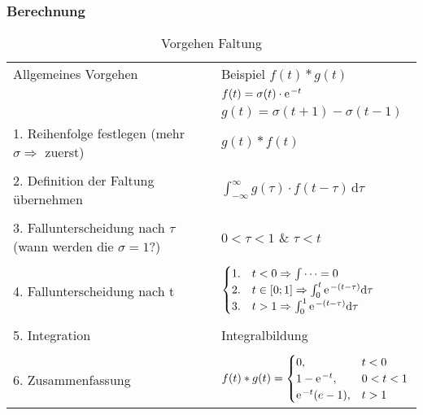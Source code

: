 \subsubsection{Berechnung}
\begin{table}[h]
	\begin{tabular}{ll}
		Allgemeines Vorgehen & Beispiel $f(t) * g(t) $\\
				     &$f(t)=\sigma(t)\cdot\e^{-t}$\\
		       & $g(t) = \sigma(t+1) - \sigma(t-1)$\\
		\toprule
		1. Reihenfolge festlegen (mehr $\sigma \Rightarrow$ zuerst) & $g(t)*f(t)$\\
									    &\\
		2. Definition der Faltung übernehmen & $\int_{-\infty}^{\infty}\!g(\tau)\cdot f(t-\tau)\,\mathrm{d}\tau$\\
						      &\\
		3. Fallunterscheidung nach $\tau$ (wann werden die $\sigma=1$?) & $0 < \tau < 1$ \&  $\tau < t$\\
										&\\
		4. Fallunterscheidung nach t & $\begin{cases} 	1. & t < 0 \Rightarrow \int\dots = 0\\ 
								2. & t \in \left[0;1\right] \Rightarrow \int_0^t\e^{-(t-\tau)}\mathrm{d}\tau\\
								3. & t > 1 \Rightarrow \int_0^1\e^{-(t-\tau)}\mathrm{d}\tau
						\end{cases}$\\
						&\\
		5. Integration & Integralbildung\\
							   &\\
		6. Zusammenfassung & $f(t) * g(t) = \begin{cases}
							0, & t < 0\\
						1-\e^{-t}, & 0 < t < 1\\
						\e^{-t}(e-1), & t > 1
						\end{cases}$\\
	\end{tabular}
	\caption{Vorgehen Faltung}
	\label{tab:vorgehen_faltung}
\end{table}

\clearpage


